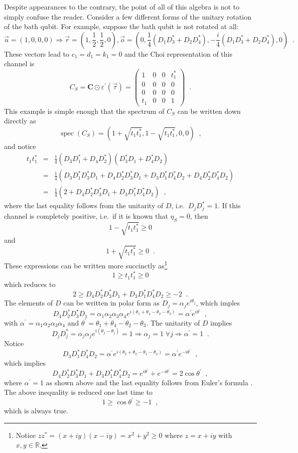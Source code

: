 Despite appearances to the contrary, the point of all of this algebra is not to simply confuse the reader.  Consider a few different forms of the unitary rotation of the bath qubit.  For example, suppose the bath qubit is not rotated at all:
$$
\vec{u} = (1,0,0,0) \Rightarrow \vec{r} = \left(1,\frac{1}{2},\frac{1}{2},0\right),\vec{o}=\left(0,\frac{1}{4}\left(D_1D_3^*+D_2D_4^*\right),-\frac{i}{4}\left(D_1D_3^*+D_2D_4^*\right),0\right)\;\;.
$$
These vectors lead to $c_1=d_1=k_1=0$ and the Choi representation of this channel is
$$
C_S = \mathbf{C}\odot\varepsilon^\prime(\vec{\tau}) = \begin{pmatrix}
1 &0 &0 &t_1^* \\
0 &0 &0 &0\\
0 &0 &0 &0\\
t_1 &0 &0 &1
\end{pmatrix}\;\;.
$$
This example is simple enough that the spectrum of $C_S$ can be written down directly as
$$
\operatorname{spec}(C_S) = \left(1+\sqrt{t_1t_1^*},1-\sqrt{t_1t_1^*},0,0\right)\;\;,
$$
and notice
\begin{eqnarray*}
t_1 t_1^* &=& \frac{1}{4} \left(D_3 D_1^* + D_4 D_2^*\right)\left(D_3^* D_1 + D_4^* D_2\right)\\
&=& \frac{1}{4} \left(D_3 D_1^* D_3^* D_1 + D_4 D_2^* D_3^* D_1 + D_3 D_1^* D_4^* D_2 + D_4 D_2^* D_4^* D_2\right)\\
&=& \frac{1}{4}\left(2 + D_4 D_2^* D_3^* D_1 + D_3 D_1^* D_4^* D_2\right)\;\;,
\end{eqnarray*}
where the last equality follows from the unitarity of $D$, i.e.\ $D_jD_j^* = 1$.  If this channel is completely positive, i.e.\ if it is known that $\eta_S=0$, then
$$
1-\sqrt{t_1t_1^*} \ge 0
$$
and
$$
1+\sqrt{t_1t_1^*} \ge 0\;\;.
$$
These expressions can be written more succinctly as\footnote{Notice $zz^*=(x+iy)(x-iy)=x^2+y^2\ge 0$ where $z=x+iy$ with $x,y\in\mathbb{R}$.}
$$
1\ge t_1 t_1^* \ge 0
$$
which reduces to
$$
2 \ge D_4 D_2^* D_3^* D_1 + D_3 D_1^* D_4^* D_2 \ge -2 \;\;.
$$
The elements of $D$ can be written in polar form as $D_j = \alpha_je^{i\theta_j}$, which imples
$$
D_4 D_2^* D_3^* D_1 = \alpha_1\alpha_2\alpha_3\alpha_4e^{i(\theta_1+\theta_4-\theta_2-\theta_3)} = \alpha^\prime e^{i\theta^\prime}\;\;,
$$
with $\alpha^\prime = \alpha_1\alpha_2\alpha_3\alpha_4$ and $\theta^\prime = \theta_1+\theta_4-\theta_2-\theta_3$.  The unitarity of $D$ implies 
$$
D_jD^*_j=\alpha_j\alpha_je^{i(\theta_j-\theta_j)}=1\Rightarrow\alpha_j=1\;\forall j\Rightarrow\alpha^\prime=1\;\;.
$$
Notice
$$
D_3 D_1^* D_4^* D_2 = \alpha^\prime e^{i(\theta_3+\theta_2-\theta_1-\theta_4)} = \alpha^\prime e^{-i\theta^\prime}\;\;,
$$
which implies
$$
D_4 D_2^* D_3^* D_1 + D_3 D_1^* D_4^* D_2 = e^{i\theta^\prime} + e^{-i\theta^\prime} = 2\cos{\theta^\prime}\;\;,
$$
where $\alpha^\prime = 1$ as shown above and the last equality follows from Euler's formula \cite{Feynman1963}.  The above inequality is reduced one last time to
$$
1\ge \cos{\theta^\prime} \ge -1\;\;,
$$
which is always true.  

